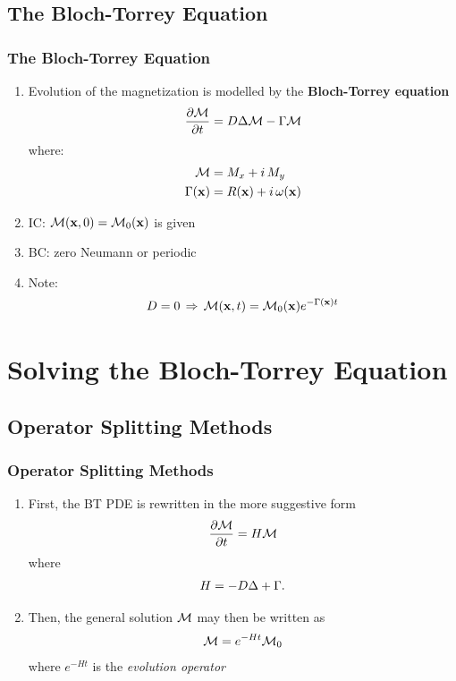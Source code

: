 \subsection{The Bloch-Torrey Equation}

\begin{frame}
\frametitle{The Bloch-Torrey Equation}
\begin{enumerate}
    \item Evolution of the magnetization is modelled by the \textbf{Bloch-Torrey equation}
    $$ \frac{\partial \mathcal{M}}{\partial t} = D \mbox{$\Delta$}{\mathcal{M}} - \Gamma \mathcal{M} $$
    where:
    \begin{align*}
        \mathcal{M} &= M_x + i \, M_y \\
        \Gamma(\mathbf{x}) &= R(\mathbf{x}) + i \, \omega(\mathbf{x})
    \end{align*}
    \pause
    \item IC: $\mathcal{M}(\mathbf{x},0) = \mathcal{M}_0(\mathbf{x})$ is given
    \pause    
    \item BC: zero Neumann or periodic
    \pause
    \item Note:
    $$ D = 0 \, \Rightarrow \, \mathcal{M}(\mathbf{x},t) = \mathcal{M}_0(\mathbf{x}) e^{-\Gamma(\mathbf{x}) t} $$
\end{enumerate}
\end{frame}

\section{Solving the Bloch-Torrey Equation}


\subsection{Operator Splitting Methods}

\begin{frame}
\frametitle{Operator Splitting Methods}
\begin{enumerate}
    \item First, the BT PDE is rewritten in the more suggestive form
    $$ \frac{\partial \mathcal{M}}{\partial t} = H \mathcal{M} $$
    where
    \begin{gather*}
        H = -D \mbox{$\Delta$}{} + \Gamma.
    \end{gather*}
    \pause
    \item Then, the general solution $\mathcal{M}$ may then be written as
    $$ \mathcal{M} = e^{-Ht}\mathcal{M}_0 $$
    where $e^{-Ht}$ is the \textit{evolution operator}
\end{enumerate}
\end{frame}

